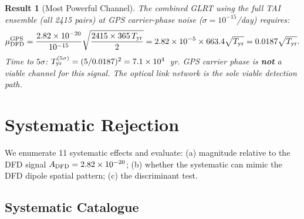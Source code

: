 \documentclass[aps,prd,twocolumn,superscriptaddress,nofootinbib]{revtex4-2}
\newtheorem{result}{Result}
\begin{document}
\begin{result}[Most Powerful Channel]
The combined GLRT using the full TAI ensemble (all 2415 pairs) at GPS
carrier-phase noise ($\sigma = 10^{-15}$/day) requires:
\begin{equation}
\mu_{\rm DFD}^{\rm GPS} = \frac{2.82\times10^{-20}}{10^{-15}}
  \sqrt{\frac{2415\times365\,T_{\rm yr}}{2}}
= 2.82\times10^{-5}\times663.4\sqrt{T_{\rm yr}}
= 0.0187\sqrt{T_{\rm yr}}.
\end{equation}
Time to $5\sigma$: $T_{\rm yr}^{(5\sigma)} = (5/0.0187)^2 = 7.1\times10^4$~yr.
GPS carrier phase is \textbf{not} a viable channel for this signal.
The optical link network is the sole viable detection path.
\end{result}

\section{Systematic Rejection}
\label{sec:systematics}

We enumerate 11 systematic effects and evaluate: (a) magnitude relative to
the DFD signal $A_{\rm DFD} = 2.82\times10^{-20}$; (b) whether the systematic
can mimic the DFD dipole spatial pattern; (c) the discriminant test.

\subsection{Systematic Catalogue}
\end{document}

